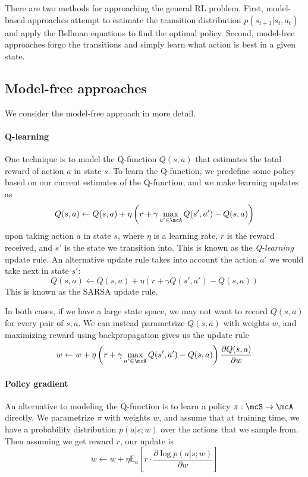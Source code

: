 \documentclass[11pt]{report}
\begin{document}
There are two methods for approaching the general RL problem. First, model-based approaches attempt to estimate the transition distribution $p(s_{t+1} | s_t, a_t)$ and apply the Bellman equations to find the optimal policy. Second, model-free approaches forgo the transitions and simply learn what action is best in a given state.

\subsection{Model-free approaches}

We consider the model-free approach in more detail.

\paragraph{Q-learning} One technique is to model the Q-function $Q(s,a)$ that estimates the total reward of action $a$ in state $s$. To learn the Q-function, we predefine some policy based on our current estimates of the Q-function, and we make learning updates as
\begin{equation}
Q(s,a) \gets Q(s,a) + \eta \left(r + \gamma \max_{a' \in \mcA} Q(s', a') - Q(s,a) \right)
\end{equation}
upon taking action $a$ in state $s$, where $\eta$ is a learning rate, $r$ is the reward received, and $s'$ is the state we transition into. This is known as the \emph{Q-learning} update rule. An alternative update rule takes into account the action $a'$ we would take next in state $s'$:
\begin{equation}
Q(s,a) \gets Q(s,a) + \eta  \left(r + \gamma Q(s', a') - Q(s,a) \right)
\end{equation}
This is known as the SARSA update rule.

In both cases, if we have a large state space, we may not want to record $Q(s,a)$ for every pair of $s,a$. We can instead parametrize $Q(s,a)$ with weights $w$, and maximizing reward using backpropagation gives us the update rule
\begin{equation}
\label{eq:reinforce}
w \gets w + \eta \left(r + \gamma \max_{a' \in \mcA} Q(s', a') - Q(s,a) \right) \frac{\partial Q(s,a)}{\partial w}
\end{equation}

\paragraph{Policy gradient} An alternative to modeling the Q-function is to learn a policy $\pi : \mcS \to \mcA$ directly. We parametrize $\pi$ with weights $w$, and assume that at training time, we have a probability distribution $p(a|s ; w)$ over the actions that we sample from. Then assuming we get reward $r$, our update is
\begin{equation}
w \gets w + \eta \mathbb{E}_a \left[ r \cdot \frac{\partial \log p(a | s ; w)}{\partial w}  \right]
\end{equation}
\end{document}
